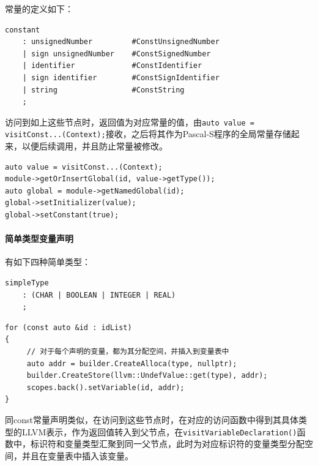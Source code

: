\documentclass[lang=cn,11pt,a4paper,cite=authornum]{paper}
\begin{document}
常量的定义如下：

\begin{code}
    \begin{verbatim}
constant
    : unsignedNumber         #ConstUnsignedNumber
    | sign unsignedNumber    #ConstSignedNumber
    | identifier             #ConstIdentifier
    | sign identifier        #ConstSignIdentifier
    | string                 #ConstString
    ;
\end{verbatim}
\end{code}

访问到如上这些节点时，返回值为对应常量的值，由\texttt{auto value = visitConst...(Context);}接收，之后将其作为Pascal-S程序的全局常量存储起来，以便后续调用，并且防止常量被修改。

\begin{code}
    \begin{verbatim}
auto value = visitConst...(Context);
module->getOrInsertGlobal(id, value->getType());
auto global = module->getNamedGlobal(id);
global->setInitializer(value);
global->setConstant(true);
\end{verbatim}
\end{code}

\paragraph{简单类型变量声明}

有如下四种简单类型：

\begin{code}
    \begin{verbatim}
simpleType
    : (CHAR | BOOLEAN | INTEGER | REAL)
    ;
\end{verbatim}
\end{code}

\begin{code}
    \begin{verbatim}
for (const auto &id : idList)
{
     // 对于每个声明的变量，都为其分配空间，并插入到变量表中
     auto addr = builder.CreateAlloca(type, nullptr);
     builder.CreateStore(llvm::UndefValue::get(type), addr);
     scopes.back().setVariable(id, addr);
}
\end{verbatim}
\end{code}

同const常量声明类似，在访问到这些节点时，在对应的访问函数中得到其具体类型的LLVM表示，作为返回值转入到父节点，在\texttt{visitVariableDeclaration()}函数中，标识符和变量类型汇聚到同一父节点，此时为对应标识符的变量类型分配空间，并且在变量表中插入该变量。
\end{document}
